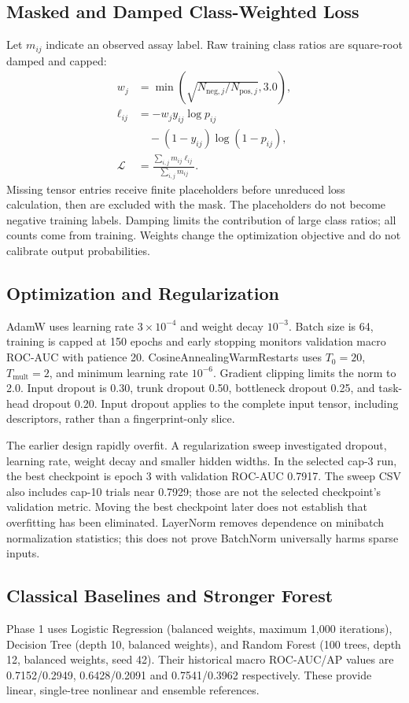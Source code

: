 \documentclass[conference]{IEEEtran}
\begin{document}
\subsection{Masked and Damped Class-Weighted Loss}
Let $m_{ij}$ indicate an observed assay label. Raw training class ratios are square-root damped and capped:
\begin{align}
w_j&=\min\left(\sqrt{N_{\mathrm{neg},j}/N_{\mathrm{pos},j}},3.0\right),\\
\ell_{ij}&=-w_jy_{ij}\log p_{ij}\\
&\quad -(1-y_{ij})\log(1-p_{ij}),\nonumber\\
\mathcal L&=\frac{\sum_{i,j}m_{ij}\ell_{ij}}{\sum_{i,j}m_{ij}}.
\end{align}
Missing tensor entries receive finite placeholders before unreduced loss calculation, then are excluded with the mask. The placeholders do not become negative training labels. Damping limits the contribution of large class ratios; all counts come from training. Weights change the optimization objective and do not calibrate output probabilities.

\subsection{Optimization and Regularization}
AdamW uses learning rate $3\times10^{-4}$ and weight decay $10^{-3}$. Batch size is 64, training is capped at 150 epochs and early stopping monitors validation macro ROC-AUC with patience 20. CosineAnnealingWarmRestarts uses $T_0=20$, $T_{\mathrm{mult}}=2$, and minimum learning rate $10^{-6}$. Gradient clipping limits the norm to 2.0. Input dropout is 0.30, trunk dropout 0.50, bottleneck dropout 0.25, and task-head dropout 0.20. Input dropout applies to the complete input tensor, including descriptors, rather than a fingerprint-only slice.

The earlier design rapidly overfit. A regularization sweep investigated dropout, learning rate, weight decay and smaller hidden widths. In the selected cap-3 run, the best checkpoint is epoch 3 with validation ROC-AUC 0.7917. The sweep CSV also includes cap-10 trials near 0.7929; those are not the selected checkpoint's validation metric. Moving the best checkpoint later does not establish that overfitting has been eliminated. LayerNorm removes dependence on minibatch normalization statistics; this does not prove BatchNorm universally harms sparse inputs.

\subsection{Classical Baselines and Stronger Forest}
Phase 1 uses Logistic Regression (balanced weights, maximum 1,000 iterations), Decision Tree (depth 10, balanced weights), and Random Forest (100 trees, depth 12, balanced weights, seed 42). Their historical macro ROC-AUC/AP values are 0.7152/0.2949, 0.6428/0.2091 and 0.7541/0.3962 respectively. These provide linear, single-tree nonlinear and ensemble references.
\end{document}
